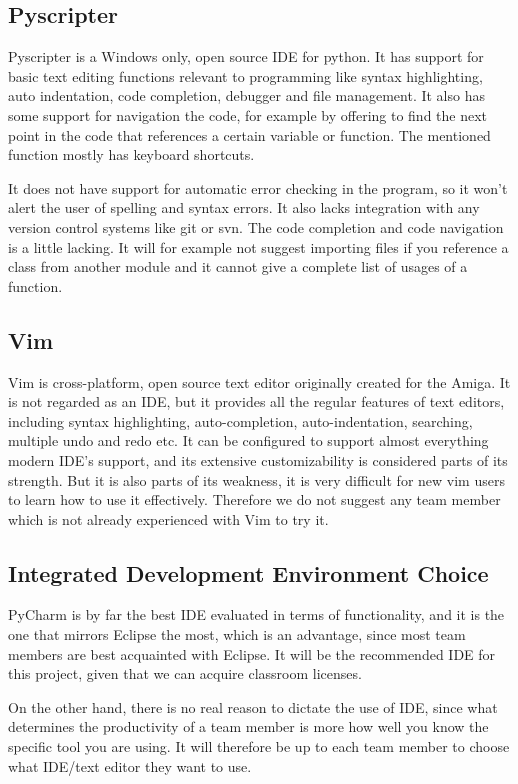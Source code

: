 \subsection{Pyscripter}
Pyscripter is a Windows only, open source IDE for python. It has support for
basic text editing functions relevant to programming like syntax highlighting,
auto indentation, code completion, debugger and file management. It also has
some support for navigation the code, for example by offering to find the next
point in the code that references a certain variable or function. The mentioned
function mostly has keyboard shortcuts.

It does not have support for automatic error checking in the program, so it
won’t alert the user of spelling and syntax errors. It also lacks integration
with any version control systems like git or svn. The code completion and
code navigation is a little lacking. It will for example not suggest importing
files if you reference a class from another module and it cannot give a
complete list of usages of a function.

\subsection{Vim}
Vim is cross-platform, open source text editor originally created for the
Amiga. It is not regarded as an IDE, but it provides all the regular features
of text editors, including syntax highlighting, auto-completion,
auto-indentation, searching, multiple undo and redo etc. It can be configured
to support almost everything modern IDE’s support, and its extensive
customizability is considered parts of its strength. But it is also parts of
its weakness, it is very difficult for new vim users to learn how to use it
effectively. Therefore we do not suggest any team member which is not already
experienced with Vim to try it.

\subsection{Integrated Development Environment Choice}
PyCharm is by far the best IDE evaluated in terms of functionality, and it is
the one that mirrors Eclipse the most, which is an advantage, since most team
members are best acquainted with Eclipse. It will be the recommended IDE for
this project, given that we can acquire classroom licenses.

On the other hand, there is no real reason to dictate the use of IDE, since
what determines the productivity of a team member is more how well you know
the specific tool you are using. It will therefore be up to each team member
to choose what IDE/text editor they want to use.

